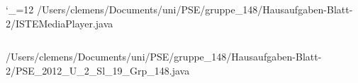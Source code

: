 \begingroup
\catcode`\_=12\relax
/Users/clemens/Documents/uni/PSE/gruppe_148/Hausaufgaben-Blatt-2/ISTEMediaPlayer.java
\inputminted{java}{/Users/clemens/Documents/uni/PSE/gruppe_148/Hausaufgaben-Blatt-2/ISTEMediaPlayer.java}
/Users/clemens/Documents/uni/PSE/gruppe_148/Hausaufgaben-Blatt-2/PSE_2012_U_2_Sl_19_Grp_148.java
\inputminted{java}{/Users/clemens/Documents/uni/PSE/gruppe_148/Hausaufgaben-Blatt-2/PSE_2012_U_2_Sl_19_Grp_148.java}
\endgroup
